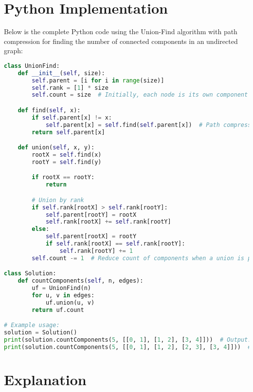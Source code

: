 \section*{Python Implementation}


Below is the complete Python code using the Union-Find algorithm with path compression for finding the number of connected components in an undirected graph:

\begin{fullwidth}
\begin{lstlisting}[language=Python]
class UnionFind:
    def __init__(self, size):
        self.parent = [i for i in range(size)]
        self.rank = [1] * size
        self.count = size  # Initially, each node is its own component

    def find(self, x):
        if self.parent[x] != x:
            self.parent[x] = self.find(self.parent[x])  # Path compression
        return self.parent[x]

    def union(self, x, y):
        rootX = self.find(x)
        rootY = self.find(y)

        if rootX == rootY:
            return

        # Union by rank
        if self.rank[rootX] > self.rank[rootY]:
            self.parent[rootY] = rootX
            self.rank[rootX] += self.rank[rootY]
        else:
            self.parent[rootX] = rootY
            if self.rank[rootX] == self.rank[rootY]:
                self.rank[rootY] += 1
        self.count -= 1  # Reduce count of components when a union is performed

class Solution:
    def countComponents(self, n, edges):
        uf = UnionFind(n)
        for u, v in edges:
            uf.union(u, v)
        return uf.count

# Example usage:
solution = Solution()
print(solution.countComponents(5, [[0, 1], [1, 2], [3, 4]]))  # Output: 2
print(solution.countComponents(5, [[0, 1], [1, 2], [2, 3], [3, 4]]))  # Output: 1
\end{lstlisting}
\end{fullwidth}

\section*{Explanation}

